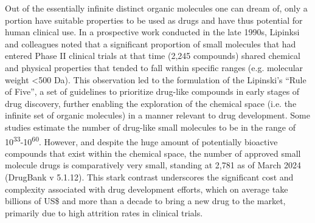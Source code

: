 Out of the essentially infinite distinct organic molecules one can dream of, only a portion have suitable properties to be used as drugs and have thus potential for human clinical use. In a prospective work conducted in the late 1990s, Lipinksi and colleagues noted that a significant proportion of small molecules that had entered Phase II clinical trials at that time (2,245 compounds) shared chemical and physical properties that tended to fall within specific ranges (e.g. molecular weight <500 Da)\cite{lipinski_experimental_2001}. This observation led to the formulation of the Lipinski's “Rule of Five”, a set of guidelines to prioritize drug-like compounds in early stages of drug discovery, further enabling the exploration of the chemical space (i.e. the infinite set of organic molecules) in a manner relevant to drug development\cite{lipinski_navigating_2004, dobson_chemical_2004, reymond_chemical_2010}. Some studies estimate the number of drug-like small molecules to be in the range of 10\textsuperscript{33}-10\textsuperscript{60}\cite{bohacek_art_1996, polishchuk_estimation_2013}. However, and despite the huge amount of potentially bioactive compounds that exist within the chemical space, the number of approved small molecule drugs is comparatively very small, standing at 2,781 as of March 2024 (DrugBank v 5.1.12). This stark contrast underscores the significant cost and complexity associated with drug development efforts, which on average take billions of US\$ and more than a decade to bring a new drug to the market\cite{wouters_estimated_2020, sertkaya_costs_2024, dimasi_innovation_2016, hinkson_accelerating_2020, dimasi_research_2020}, primarily due to high attrition rates in clinical trials\cite{sun_why_2022}. 

